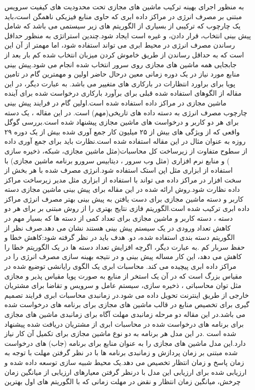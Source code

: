 به منظور اجرای بهینه ترکیب ماشین های مجازی تحت محدودیت های کیفیت سرویس
مبتنی بر مصرف انرژی در مراکز داده ابری که حاوی منابع فیزیکی ناهمگن است،باید یک چارچوب که ترکیبی از بسیاری از الگوریتم های زیر سیستمی می باشد که شامل  پیش بینی انتخاب، قرار دادن، و غیره است ایجاد شود.چندین استراتژی به منظور حداقل رساندن مصرف انرژی در محیط ابری می تواند استفاده شود، اما مهمتر از آن این است که به حداقل رساندن از طریق خاموش کردن میزبان انتخاب شده کم بار بعد از جابجایی همه ماشین های مجازی روی سرور انتخاب شده انجام می شود.پیش بینی منابع مورد نیاز در یک دوره زمانی معین درحال حاضر اولین و مهمترین گام در تامین پویا برای براورد انتظارات
 در بارکاری های متغییر می باشد. به عبارت دیگر، در این مقاله 
\cite{num12}
 از الگوهای استفاده شده قبلی برای برآورد بارکاری درخواست شده برای آینده ماشین مجازی در مراکز داده  استفاده شده است.اولین گام در فرایند پیش بینی چارچوب مصرف انرژی به دسته داده های تاریخی(مهم) است. در این مقاله ، یک دسته برای هر دو کاربر و درخواست های ماشین مجازی پیشنهاد شده است.بررسی گوگل واقعی که از ویژگی های بیش از ۲۵ میلیون کار جمع آوری شده بیش از یک دوره ۲۹ روزه به عنوان مثال در این مقاله استفاده شده است.نظارت باید برای جمع آوری داده از سطوح متفاوت از زیرساخت کل محاسبات(مثل ماشین مجازی، شبکه، ذخیره سازی ) و منابع نرم افزاری (مثل وب سرور ، دیتابیس سرورو برنامه ماشین مجازی) با استفاده از ابزاری مثل اپن استک استفاده شود.انرژی مصرف شده با هر بخش از سخت افزار در مراکز داده می تواند با استفاده از ابزاری مثل مدیر زیرساخت مراکز داده 
  نظارت شود.روش ارائه شده در این مقاله برای پیش بینی ماشین مجازی دسته کاربر و دسته ماشین مجازی برای دست یافتن به پیش بینی بهتر مصرف انرژی مراکز داده ابری ترکیب شده است.الگوریتم فازی
   نتایج بهتری را از روش مبتنی بر
   برای هر دو دسته ، دسته کاربر و ماشین مجازی برای تعداد کمی از دسته ها که بسیار مهم در کاهش تعداد ورودی در یک سیستم پیش بینی هستند نشان می دهد.صرف نظر از الگوریتم دسته بندی استفاده شده، دو. هدف باید در نظر گرفته شود:کاهش خطا و حفظ سربار کم .به عبارت دیگر، اگرچه افزایش تعداد دسته ها در یک الگوریتم خطا را کاهش می دهد، این کار مساله پیش بینی و در نتیجه بهینه سازی مصرف انرژی را در مراکز داده ابری پیچیده می کند.
محاسبات ابری یک الگوی رایانشی توضیع شده در مقیاس بزرگ است که در آن یک استخر از منابع به صورت پویا مقیاس پذیر و مجازی مثل توان محاسباتی ، ذخیره سازی، سیستم عامل و سرویس و تقاضا برای مشتریان خارجی از طریق اینترنت تحویل داده می شود.در زمانبدی محاسبات ابری فرایند تصمیم گیری برای تخصیص منابع در قالب ماشین های مجازی برای برنامه های درخواست شده می باشد.در این مقاله
\cite{num13}
دو مرحله زمانبدی مهلت آگاه برای زمانبدی ماشین های مجازی برای برنامه های درخواست شده در محاسبات ابری از مشتریان دریافت شده پیشنهاد شده است .در این مدل هر برنامه به دو نوع ماشین مجازی برای تکمیل آن کار نیاز دارد.این مدل ماشین های مجازی را به عنوان منابع برای برنامه (جاب) های درخواست شده مبتنی بر زمان پردازش و زمانبدی برنامه ها با در نظر گرفتن مهلت با توجه به زمان پاسخ و زمان انتظار تخصیص می دهد.یک محیط شبیه سازی توسعه داده شده و ارزیابی شده برای ارزیابی این مدل با درنظر گرفتن معیارهای ارزیابی از میانگین زمان چرخش، میانگین زمان انتظار و نقض در مهلت زمانی که با الگوریتم های اول بهترین 
